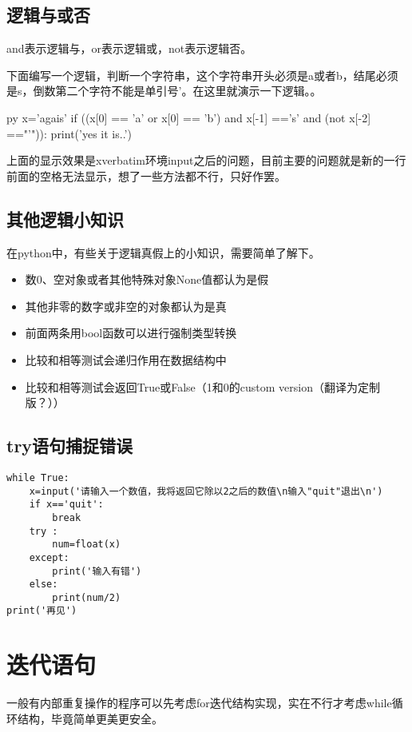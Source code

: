\documentclass[12pt,oneside]{book}
\begin{document}
\begin{common-format}
\subsection{逻辑与或否}
and表示逻辑与，or表示逻辑或，not表示逻辑否。

下面编写一个逻辑，判断一个字符串，这个字符串开头必须是a或者b，结尾必须是s，倒数第二个字符不能是单引号'。在这里就演示一下逻辑。。
\begin{xverbatim}[129]{py}
x='agais'
if ((x[0] == 'a' or x[0] == 'b')
    and x[-1] =='s'
    and (not x[-2] =="'")):
    print('yes it is..')
\end{xverbatim}
上面的显示效果是xverbatim环境input之后的问题，目前主要的问题就是新的一行前面的空格无法显示，想了一些方法都不行，只好作罢。



\subsection{其他逻辑小知识}
在python中，有些关于逻辑真假上的小知识，需要简单了解下。
\begin{itemize}
\item 数0、空对象或者其他特殊对象None值都认为是假
\item 其他非零的数字或非空的对象都认为是真
\item 前面两条用bool函数可以进行强制类型转换
\item 比较和相等测试会递归作用在数据结构中
\item 比较和相等测试会返回True或False（1和0的custom version（翻译为定制版？））
\end{itemize}


\subsection{try语句捕捉错误}
\begin{Verbatim}
while True:
    x=input('请输入一个数值，我将返回它除以2之后的数值\n输入"quit"退出\n')
    if x=='quit':
        break
    try :
        num=float(x)
    except:
        print('输入有错')
    else:
        print(num/2)
print('再见')
\end{Verbatim}





\section{迭代语句}
一般有内部重复操作的程序可以先考虑for迭代结构实现，实在不行才考虑while循环结构，毕竟简单更美更安全。


\end{common-format}
\end{document}
